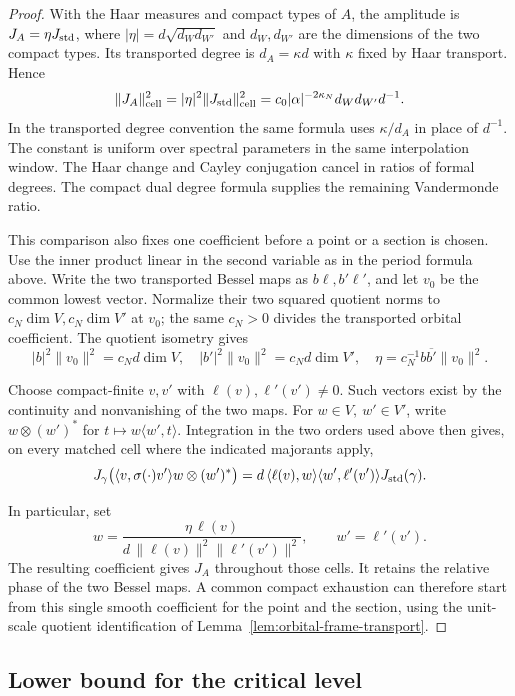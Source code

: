 \begin{proof}
With the Haar measures and compact types of \(A\), the amplitude is \(J_A=\eta J_{\rm std}\), where
\(|\eta|=d\sqrt{d_Wd_{W'}}\) and \(d_W,d_{W'}\) are
the dimensions of the two compact types. Its transported degree
is \(d_A=\kappa d\) with \(\kappa\) fixed by Haar transport. Hence
\[
 \|J_A\|_{\rm cell}^2
   = |\eta|^2\|J_{\rm std}\|_{\rm cell}^2
   = c_0|\alpha|^{-2\kappa_N}d_Wd_{W'}d^{-1}.
\]
In the transported degree convention the same formula uses
\(\kappa/d_A\) in place of \(d^{-1}\).
The constant is uniform over spectral parameters in the
same interpolation window. The Haar change and Cayley
conjugation cancel in ratios of formal degrees. The compact
dual degree formula supplies the remaining Vandermonde ratio.

This comparison also fixes one coefficient before a point or a
section is chosen. Use the inner product linear in the second
variable as in the period formula above. Write the two transported
Bessel maps as \(b\ell,b'\ell'\), and let \(v_0\) be the common
lowest vector. Normalize their two squared quotient norms to
\(c_N\dim V,c_N\dim V'\) at \(v_0\); the same \(c_N>0\) divides
the transported orbital coefficient. The quotient isometry gives
\[
 |b|^2\|v_0\|^2=c_Nd\dim V,\quad
 |b'|^2\|v_0\|^2=c_Nd\dim V',\quad
 \eta=c_N^{-1}b\overline{b'}\|v_0\|^2 .
\]

Choose compact-finite \(v,v'\) with \(\ell(v),\ell'(v')\ne0\).
Such vectors exist by the continuity and nonvanishing of the two
maps. For \(w\in V,\ w'\in V'\), write \(w\otimes(w')^*\) for
\(t\mapsto w\langle w',t\rangle\). Integration in the two orders
used above then gives, on every matched cell where the indicated
majorants apply,
\[
 J_\gamma\big(\langle v,\sigma(\cdot)v'\rangle
                    w\otimes(w')^*\big)
   =d\,\langle\ell(v),w\rangle\langle w',\ell'(v')\rangle
                J_{\rm std}(\gamma).
\]

In particular, set
\[
 w=\frac{\eta\,\ell(v)}
      {d\,\|\ell(v)\|^2\|\ell'(v')\|^2},\qquad w'=\ell'(v').
\]
The resulting coefficient gives \(J_A\) throughout those cells.
It retains the relative phase of the two Bessel maps. A common
compact exhaustion can therefore start from this single smooth
coefficient for the point and the section, using the unit-scale
quotient identification of Lemma~\ref{lem:orbital-frame-transport}.

\end{proof}

\subsection{Lower bound for the critical level}

